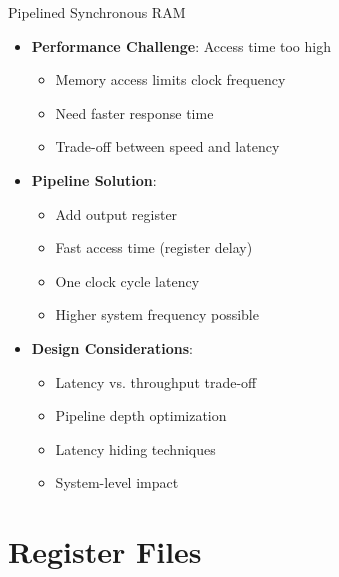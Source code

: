 \documentclass[aspectratio=169,11pt]{beamer}
\newcommand{\concept}[1]{\textbf{\color{accentcolor}#1}}
\begin{document}
\begin{frame}{Pipelined Synchronous RAM}
\begin{itemize}
\item \concept{Performance Challenge}: Access time too high
\begin{itemize}
\item Memory access limits clock frequency
\item Need faster response time
\item Trade-off between speed and latency
\end{itemize}
\vspace{0.5cm}
\item \concept{Pipeline Solution}:
\begin{itemize}
\item Add output register
\item Fast access time (register delay)
\item One clock cycle latency
\item Higher system frequency possible
\end{itemize}
\vspace{0.3cm}
\item \concept{Design Considerations}:
\begin{itemize}
\item Latency vs. throughput trade-off
\item Pipeline depth optimization
\item Latency hiding techniques
\item System-level impact
\end{itemize}
\end{itemize}
\end{frame}

\section{Register Files}
\end{document}
